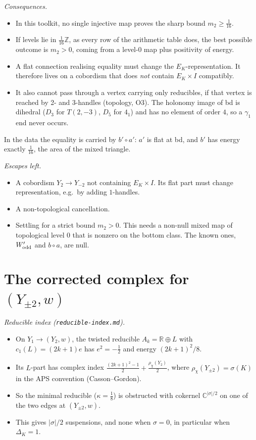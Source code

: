 \documentclass[10pt]{amsart}
\newcommand{\st}[1]{\par\noindent\textit{#1}\enspace}
\begin{document}
\st{Consequences.}
\begin{itemize}
\item In this toolkit, no single injective map proves the sharp bound $m_2\ge\frac1{16}$.
\item If levels lie in $\frac1{16}\mathbb Z$, as every row of the arithmetic table does, the best possible outcome is $m_2>0$, coming from a level-$0$ map plus positivity of energy.
\item A flat connection realising equality must change the $E_K$-representation. It therefore lives on a cobordism that does \emph{not} contain $E_K\times I$ compatibly.
\item It also cannot pass through a vertex carrying only reducibles, if that vertex is reached by 2- and 3-handles (topology, O3). The holonomy image of bd is dihedral ($D_3$ for $T(2,-3)$, $D_5$ for $4_1$) and has no element of order $4$, so a $\gamma_1$ end never occurs.
\end{itemize}
In the data the equality is carried by $b'\circ a'$: $a'$ is flat at bd, and $b'$ has energy
exactly $\frac1{16}$, the area of the mixed triangle.

\st{Escapes left.}
\begin{itemize}
\item A cobordism $Y_2\to Y_{-2}$ not containing $E_K\times I$. Its flat part must change representation, e.g.\ by adding $1$-handles.
\item A non-topological cancellation.
\item Settling for a strict bound $m_2>0$. This needs a non-null mixed map of topological level $0$ that is nonzero on the bottom class. The known ones, $W'_{\rm odd}$ and $b\circ a$, are null.
\end{itemize}

\section{The corrected complex for $(Y_{\pm2},w)$}

\st{Reducible index (\texttt{reducible-index.md}).}
\begin{itemize}
\item On $Y_1\to(Y_2,w)$, the twisted reducible $A_k=\mathbb R\oplus L$ with $c_1(L)=(2k+1)e$ has $e^2=-\frac12$ and energy $(2k+1)^2/8$.
\item Its $L$-part has complex index $\frac{(2k+1)^2-1}2+\frac{\rho_\chi(Y_2)}2$, where $\rho_\chi(Y_{\pm2})=\sigma(K)$ in the APS convention (Casson--Gordon).
\item So the minimal reducible ($\kappa=\frac18$) is obstructed with cokernel $\mathbb C^{|\sigma|/2}$ on one of the two edges at $(Y_{\pm2},w)$.
\item This gives $|\sigma|/2$ suspensions, and none when $\sigma=0$, in particular when $\Delta_K=1$.
\end{itemize}
\end{document}
